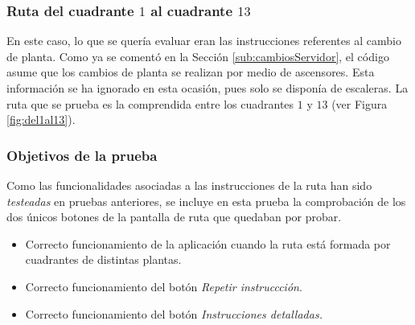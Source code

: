 \subsubsection{Ruta del cuadrante $1$ al cuadrante $13$}
\label{subsub:del1al13}

En este caso, lo que se quería evaluar eran las instrucciones referentes al cambio de planta. Como ya se comentó en la Sección \ref{sub:cambiosServidor}, el código asume que los cambios de planta se realizan por medio de ascensores. Esta información se ha ignorado en esta ocasión, pues solo se disponía de escaleras. La ruta que se prueba es la comprendida entre los cuadrantes $1$ y $13$ (ver Figura \ref{fig:del1al13}).

\subsubsection*{Objetivos de la prueba}

Como las funcionalidades asociadas a las instrucciones de la ruta han sido \textit{testeadas} en pruebas anteriores, se incluye en esta prueba la comprobación de los dos únicos botones de la pantalla de ruta que quedaban por probar.

\begin{itemize}
	\item Correcto funcionamiento de la aplicación cuando la ruta está formada por cuadrantes de distintas plantas. 
	
	\item Correcto funcionamiento del botón \textit{Repetir instruccción}.
	
	\item Correcto funcionamiento del botón \textit{Instrucciones detalladas.}
\end{itemize}

